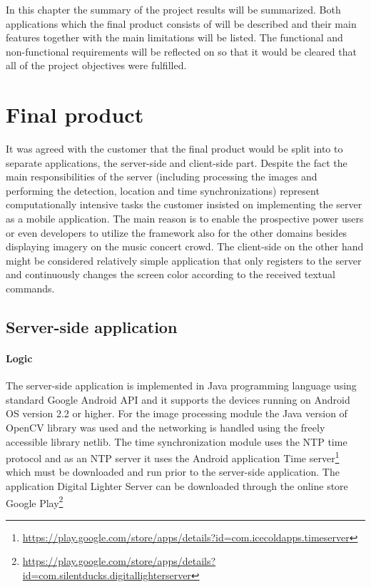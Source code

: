 In this chapter the summary of the project results will be summarized. Both applications which the final product consists of will be described and their main features together with the main limitations will be listed.  The functional and non-functional requirements will be reflected on so that it would be cleared that all of the project objectives were fulfilled. 

\section{Final product}
It was agreed with the customer that the final product would be split into to separate applications, the server-side and client-side part. Despite the fact the main responsibilities of the server (including processing the images and performing the detection, location and time synchronizations) represent computationally intensive tasks the customer insisted on implementing the server as a mobile application. The main reason is to enable the prospective power users or even developers to utilize the framework also for the other domains besides displaying imagery on the music concert crowd. The client-side on the other hand might be considered relatively simple application that only registers to the server and continuously changes the screen color according to the received textual commands.

\subsection{Server-side application}

\paragraph{Logic}
The server-side application is implemented in Java programming language using standard Google Android API and it supports the devices running on Android OS version 2.2 or higher. For the image processing module the Java version of OpenCV library was used and the networking is handled using the freely accessible library netlib. The time synchronization module uses the NTP time protocol and as an NTP server it uses the Android application Time server\footnote{\url{https://play.google.com/store/apps/details?id=com.icecoldapps.timeserver}} which must be downloaded and run prior to the server-side application. The application Digital Lighter Server can be downloaded through the online store Google Play\footnote{\url{https://play.google.com/store/apps/details?id=com.silentducks.digitallighterserver}}

